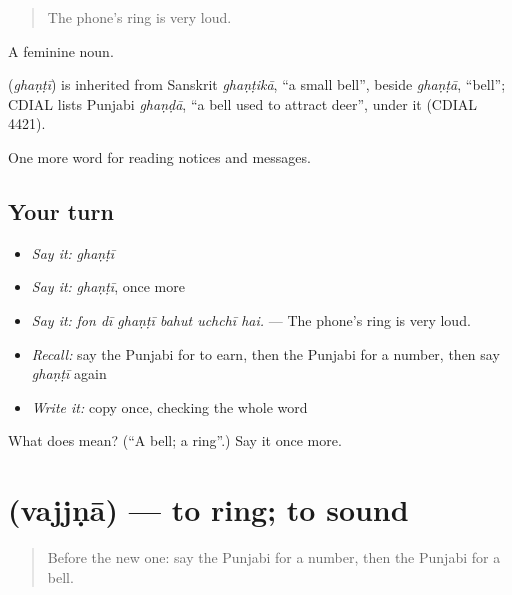 \begin{quote}
The phone's ring is very loud.
\end{quote}

A feminine noun.

\begin{cousinweb}
\textbf{} (\emph{ghaṇṭī}) is inherited from Sanskrit \emph{ghaṇṭikā}, \textquotedblleft{}a small bell\textquotedblright{}, beside \emph{ghaṇṭā}, \textquotedblleft{}bell\textquotedblright{}; CDIAL lists Punjabi \emph{ghaṇḍā}, \textquotedblleft{}a bell used to attract deer\textquotedblright{}, under it (CDIAL 4421).
\end{cousinweb}

\begin{grammarlens}[title={What you've built}]
One more word for reading notices and messages.
\end{grammarlens}

\subsection*{Your turn}
\begin{itemize}
\raggedright
  \item \emph{Say it:} \emph{ghaṇṭī}
  \item \emph{Say it:} \emph{ghaṇṭī}, once more
  \item \emph{Say it:} \emph{fon dī ghaṇṭī bahut uchchī hai.} — The phone's ring is very loud.
  \item \emph{Recall:} say the Punjabi for to earn, then the Punjabi for a number, then say \emph{ghaṇṭī} again
  \item \emph{Write it:} copy \textbf{} once, checking the whole word
\end{itemize}

\begin{tcolorbox}[breakable,colback=teal!4,colframe=teal!35!black,title={Before you move on}]
What does  mean? (\textquotedblleft{}A bell; a ring\textquotedblright{}.) Say it once more.
\end{tcolorbox}
\section[\texorpdfstring{\pa{ਵੱਜਣਾ} (vajjṇā)}{ਵੱਜਣਾ (vajjṇā)}]{ (vajjṇā) — to ring; to sound}

\label{lesson:PA-C259-vajjna}



\begin{quote}
Before the new one: say the Punjabi for a number, then the Punjabi for a bell.
\end{quote}

